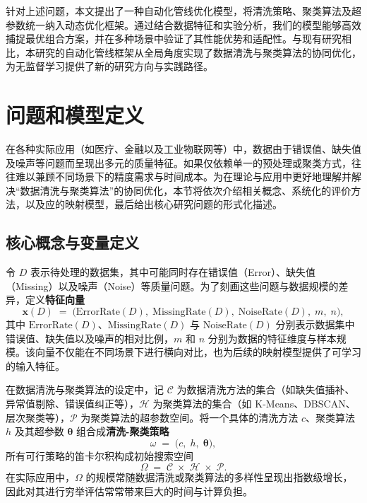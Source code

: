 \documentclass[10pt]{article} %
\numberwithin{equation}{section}
\begin{document}
针对上述问题，本文提出了一种自动化管线优化模型，将清洗策略、聚类算法及超参数统一纳入动态优化框架。通过结合数据特征和实验分析，我们的模型能够高效捕捉最优组合方案，并在多种场景中验证了其性能优势和适配性。与现有研究相比，本研究的自动化管线框架从全局角度实现了数据清洗与聚类算法的协同优化，为无监督学习提供了新的研究方向与实践路径。

\section{问题和模型定义}
\label{sec:problem-and-model}

在各种实际应用（如医疗、金融以及工业物联网等）中，数据由于错误值、缺失值及噪声等问题而呈现出多元的质量特征。如果仅依赖单一的预处理或聚类方式，往往难以兼顾不同场景下的精度需求与时间成本。为在理论与应用中更好地理解并解决“数据清洗与聚类算法”的协同优化，本节将依次介绍相关概念、系统化的评价方法，以及应的映射模型，最后给出核心研究问题的形式化描述。

\subsection{核心概念与变量定义}
\label{subsec:core-concepts}

令 \(D\) 表示待处理的数据集，其中可能同时存在错误值（Error）、缺失值（Missing）以及噪声（Noise）等质量问题。为了刻画这些问题与数据规模的差异，定义\textbf{特征向量}
\begin{equation}\label{eq:xD}
  \mathbf{x}(D) 
  \;=\; 
  \bigl(\mathrm{ErrorRate}(D),\; \mathrm{MissingRate}(D),\; \mathrm{NoiseRate}(D),\; m,\; n\bigr),
\end{equation}
其中 \(\mathrm{ErrorRate}(D)\)、\(\mathrm{MissingRate}(D)\) 与 \(\mathrm{NoiseRate}(D)\) 分别表示数据集中错误值、缺失值以及噪声的相对比例，\(m\) 和 \(n\) 分别为数据的特征维度与样本规模。该向量不仅能在不同场景下进行横向对比，也为后续的映射模型提供了可学习的输入特征。

在数据清洗与聚类算法的设定中，记 \(\mathcal{C}\) 为数据清洗方法的集合（如缺失值插补、异常值剔除、错误值纠正等），\(\mathcal{H}\) 为聚类算法的集合（如 K-Means、DBSCAN、层次聚类等），\(\mathcal{P}\) 为聚类算法的超参数空间。将一个具体的清洗方法 \(c\)、聚类算法 \(h\) 及其超参数 \(\boldsymbol{\theta}\) 组合成\textbf{清洗-聚类策略}
\begin{equation}\label{eq:omega}
  \omega 
  \;=\; 
  \bigl(c,\; h,\; \boldsymbol{\theta}\bigr),
\end{equation}
所有可行策略的笛卡尔积构成初始搜索空间
\begin{equation}\label{eq:Omega}
  \Omega 
  \;=\; 
  \mathcal{C} \;\times\; \mathcal{H} \;\times\; \mathcal{P}.
\end{equation}
在实际应用中，\(\Omega\) 的规模常随数据清洗或聚类算法的多样性呈现出指数级增长，因此对其进行穷举评估常常带来巨大的时间与计算负担。
\end{document}
